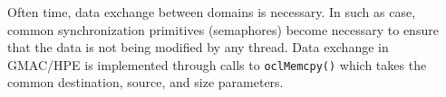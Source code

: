 Often time, data exchange between domains is necessary. In such as case, common synchronization 
primitives (\eg semaphores) become necessary to ensure that the data is not being modified by any 
thread. Data exchange in GMAC\slash HPE is implemented through calls to \texttt{oclMemcpy()} which 
takes the common destination, source, and size parameters.

